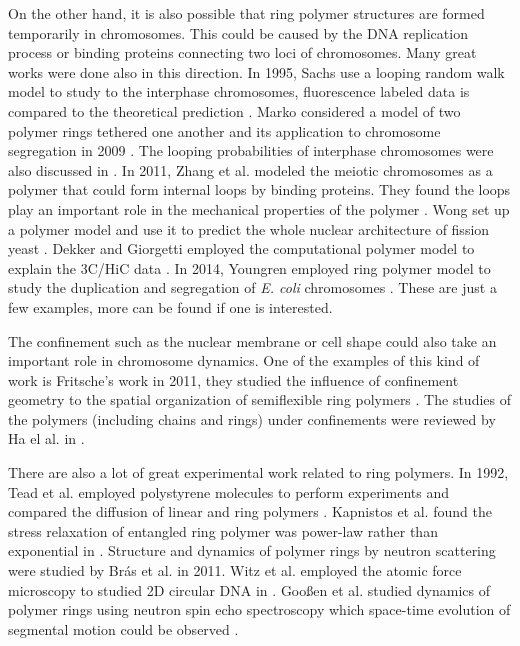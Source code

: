 On the other hand, it is also possible that ring polymer structures are formed temporarily in chromosomes. This could be caused by the DNA replication process or binding proteins connecting two loci of chromosomes. Many great works were done also in this direction. In 1995, Sachs use a looping random walk model to study to the interphase chromosomes, fluorescence labeled data is compared to the theoretical prediction \cite{Sachs1995}. Marko considered a model of two polymer rings tethered one another and its application to chromosome segregation in 2009 \cite{Marko2009}.  The looping probabilities of interphase chromosomes were also discussed in \cite{Rosa2010}.  In 2011, Zhang et al. modeled the meiotic chromosomes as a polymer that could form internal loops by binding proteins. They found the loops play an important role in the mechanical properties of the polymer \cite{Zhang2011a}. Wong set up a polymer model and use it to predict the whole nuclear architecture of fission yeast \cite{Wong2012}. Dekker and Giorgetti employed the computational polymer model to explain the 3C/HiC data \cite{Dekker2013,Giorgetti2014}. In 2014, Youngren employed ring polymer model to study the duplication and segregation of \emph{E. coli} chromosomes \cite{Youngren2014}.  These are just a few examples, more can be found if one is interested.

The confinement such as the nuclear membrane or cell shape could also take an important role in chromosome dynamics. One of the examples of this kind of work is Fritsche's work in 2011, they studied the influence of confinement geometry to the spatial organization of semiflexible ring polymers \cite{Fritsche2011}. The studies of the polymers (including chains and rings) under confinements were reviewed by Ha el al. in \cite{Ha2015}. 

There are also a lot of great experimental work related to ring polymers. In 1992, Tead et al. employed polystyrene molecules to perform experiments and compared the diffusion of linear and ring polymers \cite{Tead1992}. Kapnistos et al. found the stress relaxation of entangled ring polymer was power-law rather than exponential in \cite{Kapnistos2008}. Structure and dynamics of polymer rings by neutron scattering were studied by Br\'{a}s et al. in 2011. Witz et al. employed the atomic force microscopy to studied 2D circular DNA in \cite{Witz2008,Witz2011}.  Goo{\ss}en et al. studied dynamics of polymer rings using neutron spin echo spectroscopy which space-time evolution of segmental motion could be observed \cite{goossen2014,Goossen2015}. 

